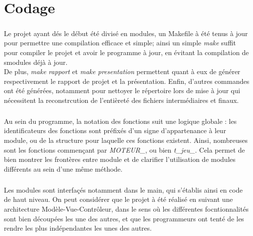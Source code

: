 \documentclass{report}
\begin{document}
\chapter{Codage} %
    \paragraph*{} %
    Le projet ayant dés le début été divisé en modules, un Makefile à été tenus à jour pour permettre une compilation efficace et simple; ainsi un simple \textit{make} suffit pour 
    compiler le projet et avoir le programme à jour, en évitant la compilation de smodules déjà à jour. \\
    De plus, \textit{make rapport} et \textit{make presentation} permettent quant à eux de générer respectivement le rapport de projet et la présentation. 
    Enfin, d'autres commandes ont été générées, notamment pour nettoyer le répertoire lors de mise à jour qui nécessitent la reconstrcution de l'entièreté des 
        fichiers intermédiaires et finaux.
    \paragraph*{} %
    Au sein du programme, la notation des fonctions suit une logique globale : les identificateurs des fonctions sont préfixés d'un signe d'appartenance à leur module, ou de la structure
        pour laquelle ces fonctions existent. Ainsi, nombreuses sont les fonctions commençant par \textit{MOTEUR\_}, ou bien \textit{t\_jeu\_}. Cela permet de bien montrer les frontères
        entre module et de clarifier l'utilisation de modules différents au sein d'une même méthode.
    \paragraph*{} %
    Les modules sont interfaçés notamment dans le main, qui s'établis ainsi en code de haut niveau. On peut considérer que le projet à été réalisé en suivant une architecture 
        Modèle-Vue-Contrôleur, dans le sens où les différentes focntionnalités sont bien découpées les une des autres, et que les programmeurs ont tenté de les rendre les plus 
        indépendantes les unes des autres.
\end{document}
